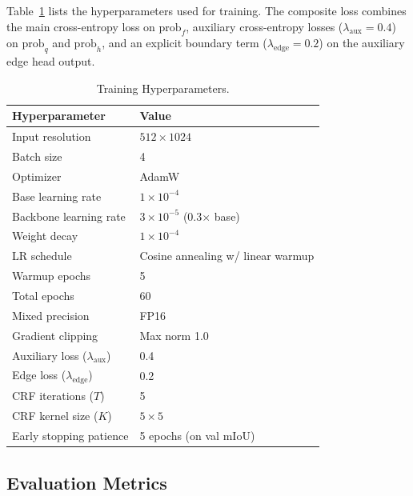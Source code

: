 \documentclass[conference]{IEEEtran}
\begin{document}
Table~\ref{tab:hparams} lists the hyperparameters used for training.
The composite loss combines the main cross-entropy loss on $\mathrm{prob}_f$,
auxiliary cross-entropy losses ($\lambda_{\mathrm{aux}} = 0.4$) on
$\mathrm{prob}_q$ and $\mathrm{prob}_h$, and an explicit boundary term
($\lambda_{\mathrm{edge}} = 0.2$) on the auxiliary edge head output.

\begin{table}[!t]
  \centering
  \caption{Training Hyperparameters.}
  \label{tab:hparams}
  \footnotesize
  \begin{tabular}{@{}ll@{}}
    \toprule
    \textbf{Hyperparameter} & \textbf{Value} \\
    \midrule
    Input resolution        & $512 \times 1024$ \\
    Batch size              & 4 \\
    Optimizer               & AdamW \\
    Base learning rate      & $1 \times 10^{-4}$ \\
    Backbone learning rate  & $3 \times 10^{-5}$ (0.3$\times$ base) \\
    Weight decay            & $1 \times 10^{-4}$ \\
    LR schedule             & Cosine annealing w/ linear warmup \\
    Warmup epochs           & 5 \\
    Total epochs            & 60 \\
    Mixed precision         & FP16 \\
    Gradient clipping       & Max norm 1.0 \\
    Auxiliary loss ($\lambda_{\mathrm{aux}}$) & 0.4 \\
    Edge loss ($\lambda_{\mathrm{edge}}$)     & 0.2 \\
    CRF iterations ($T$)    & 5 \\
    CRF kernel size ($K$)   & $5 \times 5$ \\
    Early stopping patience & 5 epochs (on val mIoU) \\
    \bottomrule
  \end{tabular}
\end{table}

\subsection{Evaluation Metrics}\label{subsec:metrics}
\end{document}
